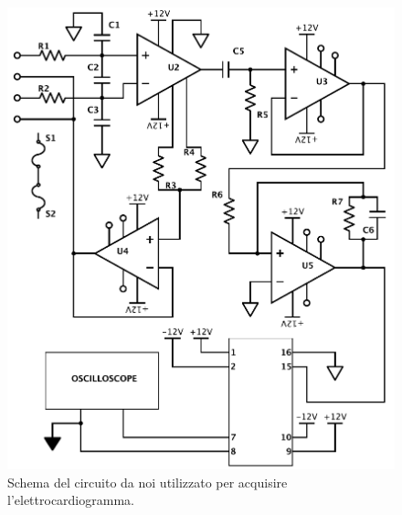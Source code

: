 \begin{figure}[tpc]
\centering
\includegraphics[width=.7\textwidth]{../E07/latex/circuito.pdf}
\caption{Schema del circuito da noi utilizzato per acquisire l'elettrocardiogramma.}
\label{fig8:compensation}
\end{figure}
